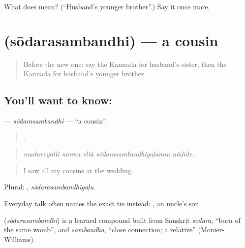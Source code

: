 \begin{tcolorbox}[breakable,colback=teal!4,colframe=teal!35!black,title={Before you move on}]
What does  mean? (\textquotedblleft{}Husband's younger brother\textquotedblright{}.) Say it once more.
\end{tcolorbox}
\section[\texorpdfstring{\kn{ಸೋದರಸಂಬಂಧಿ} (sōdarasambandhi)}{ಸೋದರಸಂಬಂಧಿ (sōdarasambandhi)}]{ (sōdarasambandhi) — a cousin}

\label{lesson:KA-C525-sodarasambandhi}



\begin{quote}
Before the new one: say the Kannada for husband's sister, then the Kannada for husband's younger brother.
\end{quote}

\subsection*{You'll want to know: }
\textbf{} — \emph{sōdarasambandhi} — \textquotedblleft{}a cousin\textquotedblright{}.

\begin{quote}
    .
\end{quote}

\begin{quote}
\emph{maduveyalli nanna ellā sōdarasambandhigaḷannu nōḍide.}
\end{quote}

\begin{quote}
I saw all my cousins at the wedding.
\end{quote}

Plural: , \emph{sōdarasambandhigaḷu}.

Everyday talk often names the exact tie instead:  , an uncle's son.

\begin{cousinweb}
\textbf{} (\emph{sōdarasambandhi}) is a learned compound built from Sanskrit \emph{sodara}, \textquotedblleft{}born of the same womb\textquotedblright{}, and \emph{sambandha}, \textquotedblleft{}close connection; a relative\textquotedblright{} (Monier-Williams).
\end{cousinweb}

